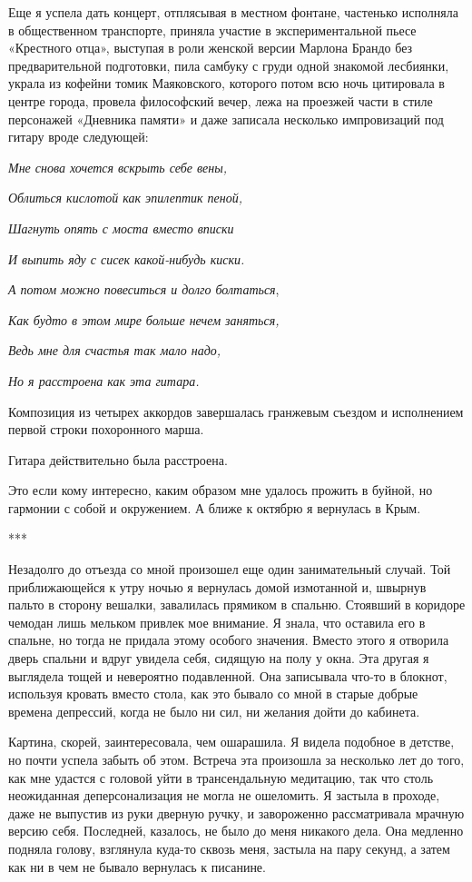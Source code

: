 \documentclass[
]{book}
\begin{document}
Еще я успела дать концерт, отплясывая в местном фонтане, частенько исполняла в общественном транспорте, приняла участие в экспериментальной пьесе «Крестного отца», выступая в роли женской версии Марлона Брандо без предварительной подготовки, пила самбуку с груди одной знакомой лесбиянки, украла из кофейни томик Маяковского, которого потом всю ночь цитировала в центре города, провела философский вечер, лежа на проезжей части в стиле персонажей «Дневника памяти» и даже записала несколько импровизаций под гитару вроде следующей:

\emph{Мне снова хочется вскрыть себе вены,}

\emph{Облиться кислотой как эпилептик пеной,}

\emph{Шагнуть опять с моста вместо вписки}

\emph{И выпить яду с сисек какой-нибудь киски.}

\emph{А потом можно повеситься и долго болтаться},

\emph{Как будто в этом мире больше нечем заняться,}

\emph{Ведь мне для счастья так мало надо,}

\emph{Но я расстроена как эта гитара. }

Композиция из четырех аккордов завершалась гранжевым съездом и исполнением первой строки похоронного марша.

Гитара действительно была расстроена.

Это если кому интересно, каким образом мне удалось прожить в буйной, но гармонии с собой и окружением. А ближе к октябрю я вернулась в Крым.

***

Незадолго до отъезда со мной произошел еще один занимательный случай. Той приближающейся к утру ночью я вернулась домой измотанной и, швырнув пальто в сторону вешалки, завалилась прямиком в спальню. Стоявший в коридоре чемодан лишь мельком привлек мое внимание. Я знала, что оставила его в спальне, но тогда не придала этому особого значения. Вместо этого я отворила дверь спальни и вдруг увидела себя, сидящую на полу у окна. Эта другая я выглядела тощей и невероятно подавленной. Она записывала что-то в блокнот, используя кровать вместо стола, как это бывало со мной в старые добрые времена депрессий, когда не было ни сил, ни желания дойти до кабинета.

Картина, скорей, заинтересовала, чем ошарашила. Я видела подобное в детстве, но почти успела забыть об этом. Встреча эта произошла за несколько лет до того, как мне удастся с головой уйти в трансендальную медитацию, так что столь неожиданная деперсонализация не могла не ошеломить. Я застыла в проходе, даже не выпустив из руки дверную ручку, и завороженно рассматривала мрачную версию себя. Последней, казалось, не было до меня никакого дела. Она медленно подняла голову, взглянула куда-то сквозь меня, застыла на пару секунд, а затем как ни в чем не бывало вернулась к писанине.
\end{document}
